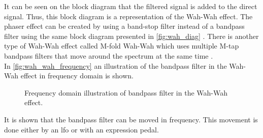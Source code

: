 It can be seen on the block diagram that the filtered signal is added to the direct signal. Thus, this block diagram is a representation of the Wah-Wah effect. 
The phaser effect can be created by using a band-stop filter instead of a bandpass filter using the same block diagram presented in \autoref{fig:wah_diag} \citep{wah-wah_cardiff}. 
There is another type of Wah-Wah effect called M-fold Wah-Wah which uses multiple M-tap bandpass filters that move around the spectrum at the same time \citep{wah-wah_cardiff}. \\
%
%
%
%
In \autoref{fig:wah_wah_frequency} an illustration of the bandpass filter in the Wah-Wah effect in frequency domain is shown. 

\begin{figure}
\centering
\def\svgwidth{\columnwidth}

\caption{Frequency domain illustration of bandpass filter in the Wah-Wah effect.}
		\label{fig:wah_wah_frequency}
\end{figure}

It is shown that the bandpass filter can be moved in frequency. This movement is done either by an \gls{lfo} or with an expression pedal.
